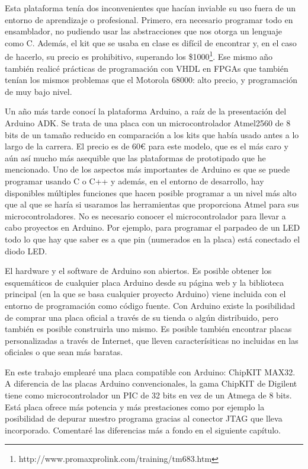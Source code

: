 Esta plataforma tenía dos inconvenientes que hacían inviable su uso fuera de un entorno de aprendizaje o profesional.  Primero, era necesario programar todo en ensamblador, no pudiendo usar las abstracciones que nos otorga un lenguaje como C.  Además, el kit que se usaba en clase es difícil de encontrar y, en el caso de hacerlo, su precio es prohibitivo, superando los \$1000\footnote{http://www.promaxprolink.com/training/tm683.htm}.  Ese mismo año también realicé prácticas de programación con VHDL en FPGAs que también tenían los mismos problemas que el Motorola 68000: alto precio, y programación de muy bajo nivel.

Un año más tarde conocí la plataforma Arduino, a raíz de la presentación del Arduino ADK. Se trata de una placa con un microcontrolador Atmel2560 de 8 bits de un tamaño reducido en comparación a los kits que había usado antes a lo largo de la carrera.  El precio es de 60\euro{} para este modelo, que es el más caro y aún así mucho más asequible que las plataformas de prototipado que he mencionado.  Uno de los aspectos más importantes de Arduino es que se puede programar usando C o C++ y además, en el entorno de desarrollo, hay disponibles múltiples funciones que hacen posible programar a un nivel más alto que al que se haría si usaramos las herramientas que proporciona Atmel para sus microcontroladores.  No es necesario conocer el microcontrolador para llevar a cabo proyectos en Arduino.  Por ejemplo, para programar el parpadeo de un LED todo lo que hay que saber es a que pin (numerados en la placa) está conectado el diodo LED.

El hardware y el software de Arduino son abiertos.  Es posible obtener los esquemáticos de cualquier placa Arduino desde su página web y la biblioteca principal (en la que se basa cualquier proyecto Arduino) viene incluida con el entorno de programación como código fuente.  Con Arduino existe la posibilidad de comprar una placa oficial a través de su tienda o algún distribuido, pero también es posible construirla uno mismo.  Es posible también encontrar placas personalizadas a través de Internet, que lleven caracterísiticas no incluidas en las oficiales o que sean más baratas.

En este trabajo emplearé una placa compatible con Arduino: ChipKIT MAX32.  A diferencia de las placas Arduino convencionales, la gama ChipKIT de Digilent tiene como microcontrolador un PIC de 32 bits en vez de un Atmega de 8 bits.  Está placa ofrece más potencia y más prestaciones como por ejemplo la posibilidad de depurar nuestro programa gracias al conector JTAG que lleva incorporado. Comentaré las diferencias más a fondo en el siguiente capítulo.

